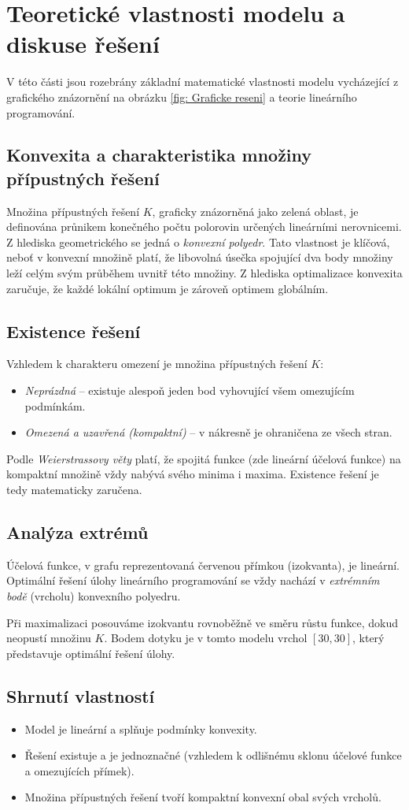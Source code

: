 \documentclass[../sablona-main.tex]{subfiles}
\begin{document}
\section{Teoretické vlastnosti modelu a diskuse řešení}

V této části jsou rozebrány základní matematické vlastnosti modelu vycházející z grafického znázornění na obrázku \ref{fig: Graficke reseni} a teorie lineárního programování.

\subsection*{Konvexita a charakteristika množiny přípustných řešení}
Množina přípustných řešení $K$, graficky znázorněná jako zelená oblast, je definována průnikem konečného počtu polorovin určených lineárními nerovnicemi. Z hlediska geometrického se jedná o \emph{konvexní polyedr}. Tato vlastnost je klíčová, neboť v konvexní množině platí, že libovolná úsečka spojující dva body množiny leží celým svým průběhem uvnitř této množiny. Z hlediska optimalizace konvexita zaručuje, že každé lokální optimum je zároveň optimem globálním.

\subsection*{Existence řešení}
Vzhledem k charakteru omezení je množina přípustných řešení $K$:
\begin{itemize}
	\item \emph{Neprázdná} – existuje alespoň jeden bod vyhovující všem omezujícím podmínkám.
	\item \emph{Omezená a uzavřená (kompaktní)} – v nákresně je ohraničena ze všech stran.
\end{itemize}
Podle \emph{Weierstrassovy věty} platí, že spojitá funkce (zde lineární účelová funkce) na kompaktní množině vždy nabývá svého minima i maxima. Existence řešení je tedy matematicky zaručena.

\subsection*{Analýza extrémů}
Účelová funkce, v grafu reprezentovaná červenou přímkou (izokvanta), je lineární. Optimální řešení úlohy lineárního programování se vždy nachází v \emph{extrémním bodě} (vrcholu) konvexního polyedru. 

Při maximalizaci posouváme izokvantu rovnoběžně ve směru růstu funkce, dokud neopustí množinu $K$. Bodem dotyku je v tomto modelu vrchol $[30, 30]$, který představuje optimální řešení úlohy.

\subsection*{Shrnutí vlastností}
\begin{itemize}
	\item Model je lineární a splňuje podmínky konvexity.
	\item Řešení existuje a je jednoznačné (vzhledem k odlišnému sklonu účelové funkce a omezujících přímek).
	\item Množina přípustných řešení tvoří kompaktní konvexní obal svých vrcholů.
\end{itemize}
\end{document}
